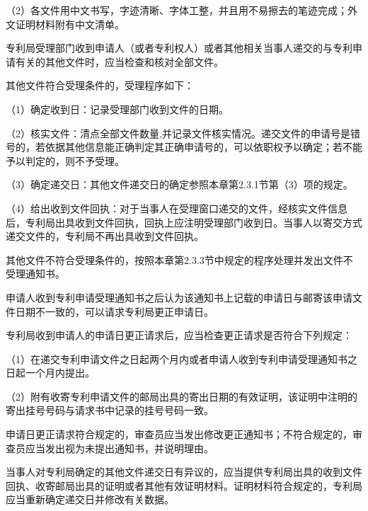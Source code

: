 {\setlength{\parindent}{17.1bp}（2）各文件用中文书写，字迹清晰、字体工整，并且用不易擦去的笔迹完成；外文证明材料附有中文清单。\par}

专利局受理部门收到申请人（或者专利权人）或者其他相关当事人递交的与专利申请有关的其他文件时，应当检查和核对全部文件。

其他文件符合受理条件的，受理程序如下：

{\setlength{\parindent}{17.1bp}（1）确定收到日：记录受理部门收到文件的日期。\par}

{\setlength{\parindent}{17.1bp}（2）核实文件：清点全部文件数量,并记录文件核实情况。递交文件的申请号是错号的，若依据其他信息能正确判定其正确申请号的，可以依职权予以确定；若不能予以判定的，则不予受理。\par}

{\setlength{\parindent}{17.1bp}（3）确定递交日：其他文件递交日的确定参照本章第2.3.1节第（3）项的规定。\par}

{\setlength{\parindent}{17.1bp}（4）给出收到文件回执：对于当事人在受理窗口递交的文件，经核实文件信息后，专利局出具收到文件回执，回执上应注明受理部门收到日。当事人以寄交方式递交文件的，专利局不再出具收到文件回执。\par}

其他文件不符合受理条件的，按照本章第2.3.3节中规定的程序处理并发出文件不受理通知书。

申请人收到专利申请受理通知书之后认为该通知书上记载的申请日与邮寄该申请文件日期不一致的，可以请求专利局更正申请日。

专利局收到申请人的申请日更正请求后，应当检查更正请求是否符合下列规定：

{\setlength{\parindent}{17.1bp}（1）在递交专利申请文件之日起两个月内或者申请人收到专利申请受理通知书之日起一个月内提出。\par}

{\setlength{\parindent}{17.1bp}（2）附有收寄专利申请文件的邮局出具的寄出日期的有效证明，该证明中注明的寄出挂号号码与请求书中记录的挂号号码一致。\par}

申请日更正请求符合规定的，审查员应当发出修改更正通知书；不符合规定的，审查员应当发出视为未提出通知书，并说明理由。

当事人对专利局确定的其他文件递交日有异议的，应当提供专利局出具的收到文件回执、收寄邮局出具的证明或者其他有效证明材料。证明材料符合规定的，专利局应当重新确定递交日并修改有关数据。

